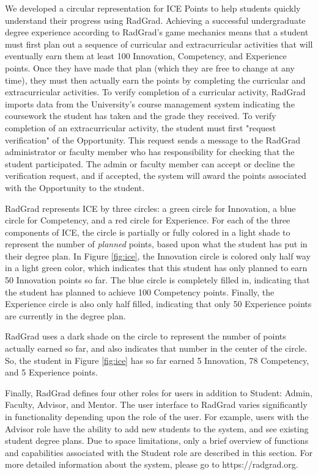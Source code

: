 \documentclass[acmsmall]{acmart}
\begin{document}
We developed a circular representation for ICE Points to help students quickly understand their progress using RadGrad.  Achieving a successful undergraduate degree experience according to RadGrad's game mechanics means that a student must first plan out a sequence of curricular and extracurricular activities that will eventually earn them at least 100 Innovation, Competency, and Experience points. Once they have made that plan (which they are free to change at any time), they must then actually earn the points by completing the curricular and extracurricular activities. To verify completion of a curricular activity, RadGrad imports data from the University's course management system indicating the coursework the student has taken and the grade they received.  To verify completion of an extracurricular activity, the student must first "request verification" of the Opportunity.  This request sends a message to the RadGrad administrator or faculty member who has responsibility for checking that the student participated. The admin or faculty member can accept or decline the verification request, and if accepted, the system will award the points associated with the Opportunity to the student.

RadGrad represents ICE by three circles: a green circle for Innovation, a blue circle for Competency, and a red circle for Experience. For each of the three components of ICE, the circle is partially or fully colored in a light shade to represent the number of {\em planned} points, based upon what the student has put in their degree plan. In Figure \ref{fig:ice}, the Innovation circle is colored only half way in a light green color, which indicates that this student has only planned to earn 50 Innovation points so far.  The blue circle is completely filled in, indicating that the student has planned to achieve 100 Competency points.  Finally, the Experience circle is also only half filled, indicating that only 50 Experience points are currently in the degree plan.

RadGrad uses a dark shade on the circle to represent the number of points actually earned so far, and also indicates that number in the center of the circle. So, the student in Figure \ref{fig:ice} has so far earned 5 Innovation, 78 Competency, and 5 Experience points.

Finally, RadGrad defines four other roles for users in addition to Student: Admin, Faculty, Advisor, and Mentor. The user interface to RadGrad varies significantly in functionality depending upon the role of the user.  For example, users with the Advisor role have the ability to add new students to the system, and see existing student degree plans. Due to space limitations, only a brief overview of functions and capabilities associated with the Student role are described in this section. For more detailed information about the system, please go to https://radgrad.org.
\end{document}
